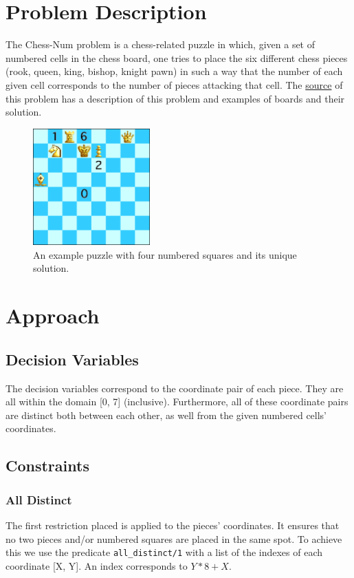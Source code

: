 \documentclass[runningheads]{llncs}
\newcommand{\inlinecode}[1]{\texttt{#1}}
\begin{document}
\section{Problem Description}
The Chess-Num problem is a chess-related puzzle in which, given a set of
numbered cells in the chess board, one tries to place the six different chess
pieces (rook, queen, king, bishop, knight pawn) in such a way that the number
of each given cell corresponds to the number of pieces attacking that cell.
The \href{https://erich-friedman.github.io/puzzle/chessnum/}{source} of this
problem has a description of this problem and examples of boards and their solution.
\begin{figure}[H]
  \centering
  \includegraphics[width=0.4\textwidth]{figures/chessdemo.eps}
  \caption{An example puzzle with four numbered squares and its unique solution.}\label{fig:fig1}
\end{figure}

\section{Approach}
\subsection{Decision Variables}
The decision variables correspond to the coordinate pair of each piece. They are all
within the domain [0, 7] (inclusive). Furthermore, all of these coordinate pairs are
distinct both between each other, as well from the given numbered cells' coordinates.

\subsection{Constraints}
\subsubsection{All Distinct}
The first restriction placed is applied to the pieces' coordinates. It ensures that
no two pieces and/or numbered squares are placed in the same spot. To achieve
this we use the predicate \inlinecode{all\_distinct/1} with a list of the indexes of
each coordinate [X, Y]. An index corresponds to $Y * 8 + X$.
\end{document}
